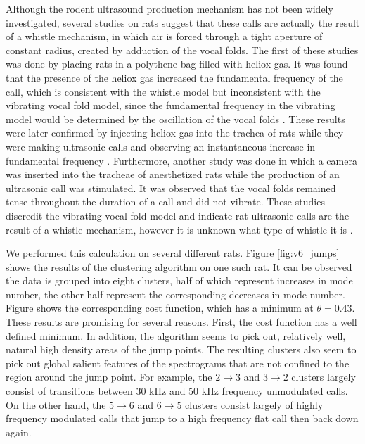 
Although the rodent ultrasound production mechanism has not been widely investigated, several studies on rats suggest that these calls are actually the result of a whistle mechanism, in which air is forced through a tight aperture of constant radius, created by adduction of the vocal folds. The first of these studies was done by placing rats in a polythene bag filled with heliox gas. It was found that the presence of the heliox gas increased the fundamental frequency of the call, which is consistent with the whistle model but inconsistent with the vibrating vocal fold model, since the fundamental frequency in the vibrating model would be determined by the oscillation of the vocal folds \cite{Roberts1975b}. These results were later confirmed by injecting heliox gas into the trachea of rats while they were making ultrasonic calls and observing an instantaneous increase in fundamental frequency \cite{Riede2011a}. Furthermore, another study was done in which a camera was inserted into the tracheae of anesthetized rats while the production of an ultrasonic call was stimulated. It was observed that the vocal folds remained tense throughout the duration of a call and did not vibrate. These studies discredit the vibrating vocal fold model and indicate rat ultrasonic calls are the result of a whistle mechanism, however it is unknown what type of whistle it is \cite{Brudzynski2010Chapter}.

We performed this calculation on several different rats. Figure \ref{fig:v6_jumps} shows the results of the clustering algorithm on one such rat. It can be observed the data is grouped into eight clusters, half of which represent increases in mode number, the other half represent the corresponding decreases in mode number. Figure shows the corresponding cost function, which has a minimum at $\theta=0.43$. These results are promising for several reasons. First, the cost function has a well defined minimum. In addition, the algorithm seems to pick out, relatively well, natural high density areas of the jump points. The resulting clusters also seem to pick out global salient features of the spectrograms that are not confined to the region around the jump point. For example, the $2\rightarrow3$ and $3\rightarrow2$ clusters largely consist of transitions between 30 kHz and 50 kHz frequency unmodulated calls. On the other hand, the $5\rightarrow6$ and $6\rightarrow5$ clusters consist largely of highly frequency modulated calls that jump to a high frequency flat call then back down again. 
